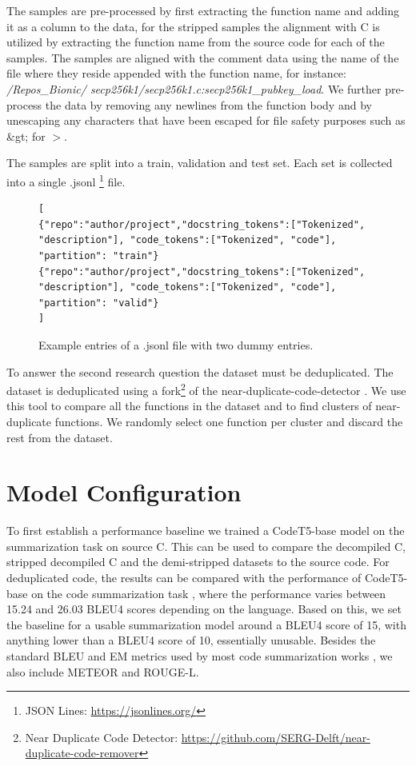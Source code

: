 The samples are pre-processed by first extracting the function name and adding it as a column to the data, for the stripped samples the alignment with C is utilized by extracting the function name from the source code for each of the samples. The samples are aligned with the comment data using the name of the file where they reside appended with the function name, for instance: \textit{/Repos\_Bionic/ secp256k1/secp256k1.c:secp256k1\_pubkey\_load}. We further pre-process the data by removing any newlines from the function body and by unescaping any characters that have been escaped for file safety purposes such as \&gt; for $>$.

The samples are split into a train, validation and test set. Each set is collected into a single .jsonl \footnote{JSON Lines: \url{https://jsonlines.org/}} file.

\label{fig:jsonl}
\begin{figure}[H]
  \centering
\begin{lstlisting}[breaklines=true]
[
{"repo":"author/project","docstring_tokens":["Tokenized", "description"], "code_tokens":["Tokenized", "code"], "partition": "train"}
{"repo":"author/project","docstring_tokens":["Tokenized", "description"], "code_tokens":["Tokenized", "code"], "partition": "valid"}
]
\end{lstlisting}
  \caption{Example entries of a .jsonl file with two dummy entries.}
\end{figure}


To answer the second research question the dataset must be deduplicated. The dataset is deduplicated using a fork\footnote{Near Duplicate Code Detector: \url{https://github.com/SERG-Delft/near-duplicate-code-remover}} of the near-duplicate-code-detector \cite{allamanis_adverse}. We use this tool to compare all the functions in the dataset and to find clusters of near-duplicate functions. We randomly select one function per cluster and discard the rest from the dataset. 


\section{Model Configuration}
To first establish a performance baseline we trained a CodeT5-base model on the summarization task on source C. This can be used to compare the decompiled C, stripped decompiled C and the demi-stripped datasets to the source code. For deduplicated code, the results can be compared with the performance of CodeT5-base on the code summarization task \cite{CodeT5}, where the performance varies between 15.24 and 26.03 BLEU4 scores depending on the language. Based on this, we set the baseline for a usable summarization model around a BLEU4 score of 15, with anything lower than a BLEU4 score of 10, essentially unusable. Besides the standard BLEU and EM metrics used by most code summarization works \cite{CodeBERT, CodeT5, CodeXGlue, PolyglotCodeBERT, CodeSumSmallLocal, recommend_summarization}, we also include METEOR and ROUGE-L. 

